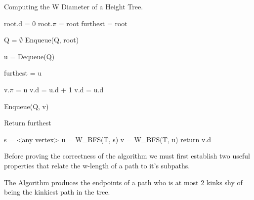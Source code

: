\begin{algorithm}
\caption{Computing the W Diameter of a Height Tree.}

\begin{algorithmic}[1]

    \State root.d = 0
    \State root.$\pi$ = root
    \State furthest = root

    \State Q = $\emptyset$
    \State Enqueue(Q, root)

        \State u = Dequeue(Q)

            \State furthest = u
        \EndIf

                \State v.$\pi$ = u
                    \State v.d = u.d + 1
                \Else
                    \State v.d = u.d
                \EndIf

                \State Enqueue(Q, v)

            \EndIf
        \EndFor
    \EndWhile
    \State Return furthest
\EndFunction

    \State s = <any vertex>
    \State u = W\_BFS(T, s)
    \State v = W\_BFS(T, u)
    \State return v.d
\EndFunction

\end{algorithmic}
\end{algorithm}

Before proving the correctness of the algorithm we must first establish two useful properties that relate the w-length of a path to it's subpaths.


\begin{lem} The Algorithm produces the endpoints of a path who is at most 2 kinks shy of being the kinkiest path in the tree. \end{lem}


